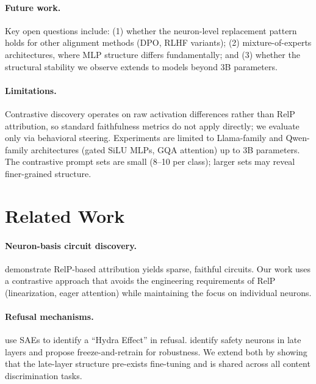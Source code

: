 \documentclass{article}
\begin{document}
\paragraph{Future work.}
Key open questions include: (1) whether the neuron-level replacement pattern holds for other alignment methods (DPO, RLHF variants); (2) mixture-of-experts architectures, where MLP structure differs fundamentally; and (3) whether the structural stability we observe extends to models beyond 3B parameters.

\paragraph{Limitations.}
Contrastive discovery operates on raw activation differences rather than RelP attribution, so standard faithfulness metrics do not apply directly; we evaluate only via behavioral steering.
Experiments are limited to Llama-family and Qwen-family architectures (gated SiLU MLPs, GQA attention) up to 3B parameters.
The contrastive prompt sets are small (8--10 per class); larger sets may reveal finer-grained structure.

\section{Related Work}
\label{sec:related}

\paragraph{Neuron-basis circuit discovery.}
\citet{arora2025circuits} demonstrate RelP-based attribution yields sparse, faithful circuits.
Our work uses a contrastive approach that avoids the engineering requirements of RelP (linearization, eager attention) while maintaining the focus on individual neurons.

\paragraph{Refusal mechanisms.}
\citet{prakash2025beyond} use SAEs to identify a ``Hydra Effect'' in refusal.
\citet{wang2026safeneuron} identify safety neurons in late layers and propose freeze-and-retrain for robustness.
We extend both by showing that the late-layer structure pre-exists fine-tuning and is shared across all content discrimination tasks.
\end{document}
